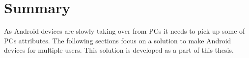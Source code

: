 \section{Summary}
As Android devices are slowly taking over from PCs it needs to pick up some of PCs attributes. The following sections focus on a solution to make Android devices for multiple users. This solution is developed as a part of this thesis.




